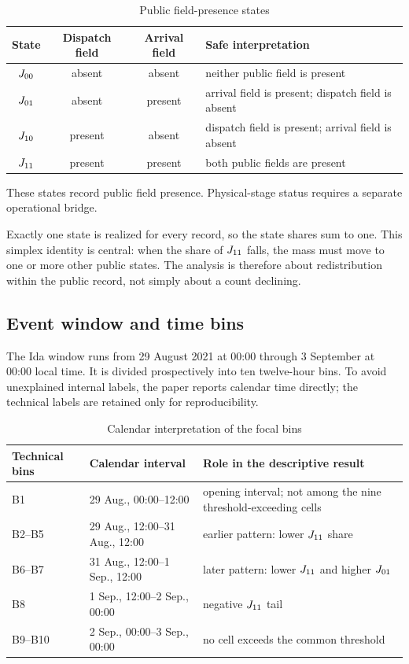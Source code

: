\documentclass[11pt]{article}
\begin{document}
\begin{table}[t]
\centering
\caption{Public field-presence states}
\label{tab:states}
\begin{tabularx}{\textwidth}{@{}c cc X@{}}
\toprule
State & Dispatch field & Arrival field & Safe interpretation \\
\midrule
$J_{00}$ & absent & absent & neither public field is present \\
$J_{01}$ & absent & present & arrival field is present; dispatch field is absent \\
$J_{10}$ & present & absent & dispatch field is present; arrival field is absent \\
$J_{11}$ & present & present & both public fields are present \\
\bottomrule
\end{tabularx}
\begin{minipage}{0.96\textwidth}\footnotesize
These states record public field presence. Physical-stage status requires a separate operational bridge.
\end{minipage}
\end{table}

Exactly one state is realized for every record, so the state shares sum to one. This simplex identity is central: when the share of $J_{11}$ falls, the mass must move to one or more other public states. The analysis is therefore about redistribution within the public record, not simply about a count declining.

\subsection{Event window and time bins}

The Ida window runs from 29 August 2021 at 00:00 through 3 September at 00:00 local time. It is divided prospectively into ten twelve-hour bins. To avoid unexplained internal labels, the paper reports calendar time directly; the technical labels are retained only for reproducibility.

\begin{table}[H]
\centering
\caption{Calendar interpretation of the focal bins}
\label{tab:bins}
\begin{tabularx}{\textwidth}{@{}l l X@{}}
\toprule
Technical bins & Calendar interval & Role in the descriptive result \\
\midrule
B1 & 29 Aug., 00:00--12:00 & opening interval; not among the nine threshold-exceeding cells \\
B2--B5 & 29 Aug., 12:00--31 Aug., 12:00 & earlier pattern: lower $J_{11}$ share \\
B6--B7 & 31 Aug., 12:00--1 Sep., 12:00 & later pattern: lower $J_{11}$ and higher $J_{01}$ \\
B8 & 1 Sep., 12:00--2 Sep., 00:00 & negative $J_{11}$ tail \\
B9--B10 & 2 Sep., 00:00--3 Sep., 00:00 & no cell exceeds the common threshold \\
\bottomrule
\end{tabularx}
\end{table}
\end{document}
